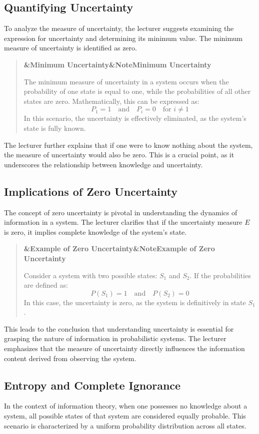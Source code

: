 \documentclass[a4paper]{article}
\newcommand{\boxheading}[1]{%
  \par\smallskip
  \noindent\textbf{\ifx&#1&Note\else#1\fi}\par
  \smallskip
}
\newenvironment{thmbox}[1][]{%
  \begin{quote}\color{blue!60!black}\boxheading{#1}\normalcolor
}{\end{quote}}
\newenvironment{exbox}[1][]{%
  \begin{quote}\color{brown!70!black}\boxheading{#1}\normalcolor
}{\end{quote}}
\begin{document}
\subsection{Quantifying Uncertainty}
To analyze the measure of uncertainty, the lecturer suggests examining the expression for uncertainty and determining its minimum value. The minimum measure of uncertainty is identified as zero.

\begin{thmbox}[Minimum Uncertainty]
The minimum measure of uncertainty in a system occurs when the probability of one state is equal to one, while the probabilities of all other states are zero. Mathematically, this can be expressed as:
\[
P_1 = 1 \quad \text{and} \quad P_i = 0 \quad \text{for } i \neq 1
\]
In this scenario, the uncertainty is effectively eliminated, as the system's state is fully known.
\end{thmbox}

The lecturer further explains that if one were to know nothing about the system, the measure of uncertainty would also be zero. This is a crucial point, as it underscores the relationship between knowledge and uncertainty.

\subsection{Implications of Zero Uncertainty}
The concept of zero uncertainty is pivotal in understanding the dynamics of information in a system. The lecturer clarifies that if the uncertainty measure \( E \) is zero, it implies complete knowledge of the system's state.

\begin{exbox}[Example of Zero Uncertainty]
Consider a system with two possible states: \( S_1 \) and \( S_2 \). If the probabilities are defined as:
\[
P(S_1) = 1 \quad \text{and} \quad P(S_2) = 0
\]
In this case, the uncertainty is zero, as the system is definitively in state \( S_1 \).
\end{exbox}

This leads to the conclusion that understanding uncertainty is essential for grasping the nature of information in probabilistic systems. The lecturer emphasizes that the measure of uncertainty directly influences the information content derived from observing the system.

\subsection{Entropy and Complete Ignorance}
In the context of information theory, when one possesses no knowledge about a system, all possible states of that system are considered equally probable. This scenario is characterized by a uniform probability distribution across all states.
\end{document}

